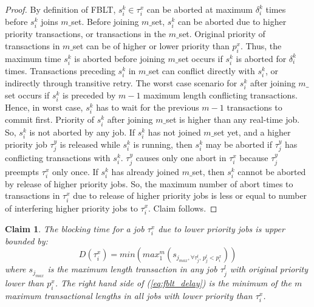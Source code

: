 \documentclass[prodmode,acmtecs]{acmsmall}
\newtheorem{clm}{Claim}
\begin{document}
\begin{compactenum}
\begin{proof}
By definition of FBLT, $s_{i}^{k}\in\tau_{i}^{x}$ can be aborted
at maximum $\delta_{i}^{k}$ times before $s_{i}^{k}$ joins $m\_$set. Before joining $m\_$set, $s_{i}^{k}$ can be aborted due to higher priority transactions, or transactions
in the $m\_$set. Original priority of transactions in $m\_$set can be of higher or lower priority than
$p_{i}^{x}$. Thus, the maximum time $s_{i}^{k}$ is aborted before
joining $m\_$set occurs if $s_{i}^{k}$ is aborted for $\delta_{i}^{k}$ times. Transactions preceding  $s_i^k$ in $m\_$set can conflict directly with $s_i^k$, or indirectly through transitive retry. The worst case scenario for $s_{i}^{k}$ after joining $m\_$set occurs if $s_{i}^{k}$ is preceded by $m-1$ maximum length conflicting transactions. Hence, in worst case, $s_{i}^{k}$ has to wait for the previous $m-1$ transactions to commit first. Priority of $s_{i}^{k}$ after joining $m\_$set is higher than any real-time job. So, $s_{i}^{k}$ is not aborted
by any job. If $s_{i}^{k}$ has not joined $m\_$set yet, and a higher
priority job $\tau_{j}^{y}$ is released while $s_{i}^{k}$ is running,
then $s_{i}^{k}$ may be aborted if $\tau_{j}^{y}$ has conflicting
transactions with $s_{i}^{k}$. $\tau_{j}^{y}$ causes only one abort
in $\tau_{i}^{x}$ because $\tau_{j}^{y}$ preempts $\tau_{i}^{x}$
only once. If $s_{i}^{k}$ has already joined $m\_$set, then $s_{i}^{k}$
cannot be aborted by release of higher priority jobs. So, the maximum
number of abort times to transactions in $\tau_{i}^{x}$ due to release
of higher priority jobs is less or equal to number of interfering
higher priority jobs to $\tau_{i}^{x}$. Claim follows.

\end{proof}

\begin{clm}

The blocking time for a job $\tau_{i}^{x}$ due to lower priority
jobs is upper bounded by: 
\begin{equation}
D(\tau_{i}^{x})=min\left(max_{1}^{m}(s_{j_{max},\forall\tau_{j}^{l},\, p_{j}^{l}<p_{i}^{x}})\right)\label{eq:fblt_delay}
\end{equation}
where $s_{j_{max}}$ is the maximum length transaction in any job
$\tau_{j}^{l}$ with original priority lower than $p_{i}^{x}$. The
right hand side of (\ref{eq:fblt_delay}) is the minimum of the $m$
maximum transactional lengths in all jobs with lower priority than
$\tau_{i}^{x}$.

\end{clm}


\end{compactenum}
\end{document}
